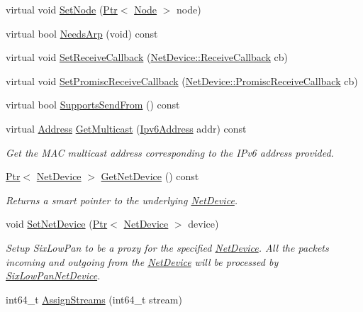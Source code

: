 \begin{DoxyCompactItemize}
\item 
virtual void \hyperlink{classns3_1_1SixLowPanNetDevice_ad848920fb4d8b4ef85f6f22c817386da}{Set\+Node} (\hyperlink{classns3_1_1Ptr}{Ptr}$<$ \hyperlink{classns3_1_1Node}{Node} $>$ node)
\item 
virtual bool \hyperlink{classns3_1_1SixLowPanNetDevice_ac75365b6ca0919c39392c4a98a7ea2a0}{Needs\+Arp} (void) const 
\item 
virtual void \hyperlink{classns3_1_1SixLowPanNetDevice_a4c0ba60e29603292740d6bb0aa103130}{Set\+Receive\+Callback} (\hyperlink{classns3_1_1NetDevice_ad5e5e1ca187472bc2ba99575d8def568}{Net\+Device\+::\+Receive\+Callback} cb)
\item 
virtual void \hyperlink{classns3_1_1SixLowPanNetDevice_a42b2eb2c8cb19b79f8a5a0e94309e28f}{Set\+Promisc\+Receive\+Callback} (\hyperlink{classns3_1_1NetDevice_a427225795919f26c414bee2ea3f31ed2}{Net\+Device\+::\+Promisc\+Receive\+Callback} cb)
\item 
virtual bool \hyperlink{classns3_1_1SixLowPanNetDevice_a53811a2fb813d5672bf7fca5660fa94d}{Supports\+Send\+From} () const 
\item 
virtual \hyperlink{classns3_1_1Address}{Address} \hyperlink{classns3_1_1SixLowPanNetDevice_ac22bc87ffcd3c9b15a52c79da88b9edb}{Get\+Multicast} (\hyperlink{classns3_1_1Ipv6Address}{Ipv6\+Address} addr) const 
\begin{DoxyCompactList}\small\item\em Get the M\+AC multicast address corresponding to the I\+Pv6 address provided. \end{DoxyCompactList}\item 
\hyperlink{classns3_1_1Ptr}{Ptr}$<$ \hyperlink{classns3_1_1NetDevice}{Net\+Device} $>$ \hyperlink{classns3_1_1SixLowPanNetDevice_a21365a973c4130399b51d175b39bbd97}{Get\+Net\+Device} () const 
\begin{DoxyCompactList}\small\item\em Returns a smart pointer to the underlying \hyperlink{classns3_1_1NetDevice}{Net\+Device}. \end{DoxyCompactList}\item 
void \hyperlink{classns3_1_1SixLowPanNetDevice_a81c74a5dc06e3fbad1a8b1c59d1f68fa}{Set\+Net\+Device} (\hyperlink{classns3_1_1Ptr}{Ptr}$<$ \hyperlink{classns3_1_1NetDevice}{Net\+Device} $>$ device)
\begin{DoxyCompactList}\small\item\em Setup Six\+Low\+Pan to be a proxy for the specified \hyperlink{classns3_1_1NetDevice}{Net\+Device}. All the packets incoming and outgoing from the \hyperlink{classns3_1_1NetDevice}{Net\+Device} will be processed by \hyperlink{classns3_1_1SixLowPanNetDevice}{Six\+Low\+Pan\+Net\+Device}. \end{DoxyCompactList}\item 
int64\+\_\+t \hyperlink{classns3_1_1SixLowPanNetDevice_a57b6b7fbbf2de21172db06d24b0a73fd}{Assign\+Streams} (int64\+\_\+t stream)
\end{DoxyCompactItemize}

